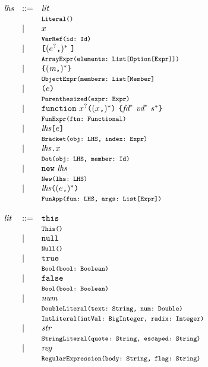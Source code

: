 \[
\begin{array}{llll}
\lhs &::=& \lit \\
&& \mtt{Literal()}\\
 &\mid& \myid \\
&& \mtt{VarRef(id:~Id)}\\
 &\mid& \verb+[+ (\expr^?\verb+,+)^* \ \verb+]+ \\
&& \mtt{ArrayExpr(elements:~List[Option[Expr]])}\\
 &\mid& \verb+{+ (\member\verb+,+)^* \verb+}+ \\
&& \mtt{ObjectExpr(members:~List[Member]}\\
 &\mid& \verb+(+ \expr \verb+)+ \\
&& \mtt{Parenthesized(expr:~Expr)}\\
 & \mid & {\tt function} \ \myid^?  \verb+(+(\myid\verb+,+)^*\verb+)+ \ \verb+{+\fd^*\ \vd^*\ \stmt^*\verb+}+ \\
&&\mtt{FunExpr(ftn:~Functional)}\\
 &\mid& \lhs \verb+[+ \expr \verb+]+ \\
&& \mtt{Bracket(obj:~LHS, index:~Expr)}\\
 &\mid& \lhs \verb+.+ \myid \\
&& \mtt{Dot(obj:~LHS, member:~Id)}\\
 &\mid& {\tt new} \ \lhs \\
&& \mtt{New(lhs:~LHS)}\\
 &\mid& \lhs \verb+(+ (\expr\verb+,+)^* \verb+)+ \\
&& \mtt{FunApp(fun:~LHS, args:~List[Expr])} \\ \\
\lit &::=& {\tt this} \\
&& \mtt{This()}\\
 &\mid& {\tt null} \\
&& \mtt{Null()}\\
 &\mid& {\tt true} \\
&& \mtt{Bool(bool:~Boolean)}\\
 &\mid& {\tt false} \\
&& \mtt{Bool(bool:~Boolean)}\\
 &\mid& \num \\
&& \mtt{DoubleLiteral(text:~String, num:~Double)}\\
&&\mtt{IntLiteral(intVal:~BigInteger, radix:~Integer)}\\
 &\mid& \str \\
&& \mtt{StringLiteral(quote:~String, escaped:~String)}\\
 &\mid& \reg \\
&& \mtt{RegularExpression(body:~String, flag:~String)}\\ \\


\end{array}\]
